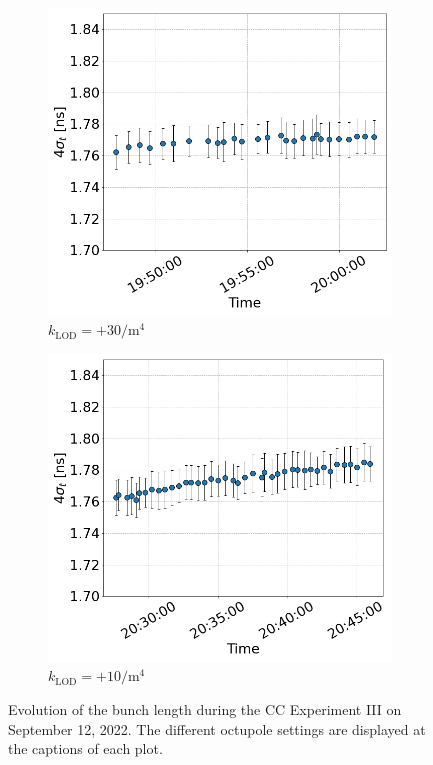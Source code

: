 \begin{figure}[htp]
\begin{subfigure}{.4\textwidth}
    \end{subfigure}
    \begin{subfigure}{.4\textwidth}
            \centering
            \includegraphics[width=.95\linewidth]{images/app_c/bunch_length_cc_md_sep_coast9.png}  
            \caption{$k_\mathrm{LOD}=+30 \mathrm{/m^{4}}$}
    \end{subfigure}
    \begin{subfigure}{.4\textwidth}
        \centering
        \includegraphics[width=.95\linewidth]{images/app_c/bunch_length_cc_md_sep_coast11.png}  
        \caption{$k_\mathrm{LOD}=+10  \mathrm{/m^{4}}$}
\end{subfigure}
    \caption{Evolution of the bunch length during the CC Experiment III on September 12, 2022. The different octupole settings are displayed at the captions of each plot.}
    \label{fig:cc_md_sep_2022_overview_plots_klod_scan_bunch_length}
 \end{figure}


